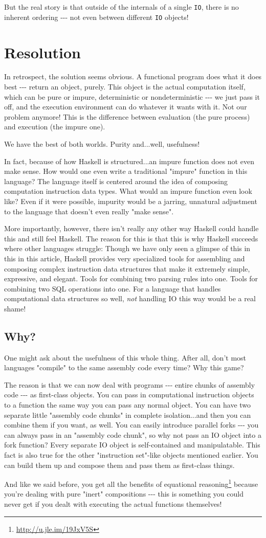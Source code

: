 \documentclass[]{article}
\renewcommand{\href}[2]{#2\footnote{\url{#1}}}
\begin{document}
But the real story is that outside of the internals of a single \texttt{IO},
there is no inherent ordering -\/-\/- not even between different \texttt{IO}
objects!

\section{Resolution}

In retrospect, the solution seems obvious. A functional program does what it
does best -\/-\/- return an object, purely. This object is the actual
computation itself, which can be pure or impure, deterministic or
nondeterministic -\/-\/- we just pass it off, and the execution environment can
do whatever it wants with it. Not our problem anymore! This is the difference
between evaluation (the pure process) and execution (the impure one).

We have the best of both worlds. Purity and...well, usefulness!

In fact, because of how Haskell is structured...an impure function does not even
make sense. How would one even write a traditional "impure" function in this
language? The language itself is centered around the idea of composing
computation instruction data types. What would an impure function even look
like? Even if it were possible, impurity would be a jarring, unnatural
adjustment to the language that doesn't even really "make sense".

More importantly, however, there isn't really any other way Haskell could handle
this and still feel Haskell. The reason for this is that this is why Haskell
succeeds where other languages struggle: Though we have only seen a glimpse of
this in this in this article, Haskell provides very specialized tools for
assembling and composing complex instruction data structures that make it
extremely simple, expressive, and elegant. Tools for combining two parsing rules
into one. Tools for combining two SQL operations into one. For a language that
handles computational data structures so well, \emph{not} handling IO this way
would be a real shame!

\subsection{Why?}

One might ask about the usefulness of this whole thing. After all, don't most
languages "compile" to the same assembly code every time? Why this game?

The reason is that we can now deal with programs -\/-\/- entire chunks of
assembly code -\/-\/- as first-class objects. You can pass in computational
instruction objects to a function the same way you can pass any normal object.
You can have two separate little "assembly code chunks" in complete
isolation...and then you can combine them if you want, as well. You can easily
introduce parallel forks -\/-\/- you can always pass in an "assembly code
chunk", so why not pass an IO object into a fork function? Every separate IO
object is self-contained and manipulatable. This fact is also true for the other
"instruction set"-like objects mentioned earlier. You can build them up and
compose them and pass them as first-class things.

And like we said before, you get all the benefits of
\href{http://u.jle.im/19JxV5S}{equational reasoning} because you're dealing with
pure "inert" compositions -\/-\/- this is something you could never get if you
dealt with executing the actual functions themselves!
\end{document}
